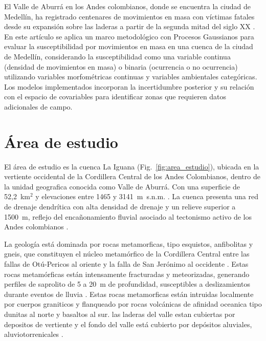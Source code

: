 \documentclass[letterpaper,11pt]{tec}
\begin{document}
{El Valle de Aburrá en los Andes colombianos, donde se encuentra la ciudad de Medellín, ha registrado
centenares de movimientos en masa con víctimas fatales desde su expansión sobre las laderas a partir de la segunda mitad del siglo XX \citep{Nieto2025, Klimes2010}.
En este artículo se aplica un marco metodológico con Procesos Gaussianos para evaluar la susceptibilidad por movimientos en masa en una cuenca de la ciudad de Medellín, 
considerando la susceptibilidad como una variable continua (densidad de movimientos en masa) o binaria (ocurrencia o no ocurrencia)
 utilizando variables morfométricas continuas y variables ambientales categóricas. Los modelos implementados incorporan la incertidumbre posterior y su relación 
 con el espacio de covariables para identificar zonas que requieren datos adicionales de campo.

\section{Área de estudio}

El área de estudio es la cuenca La Iguana (Fig.~\ref{fig:area_estudio}), ubicada en la vertiente occidental de la Cordillera
Central de los Andes Colombianos, dentro de la unidad geografica conocida como Valle de Aburrá. Con una superficie de 52{,}2~km$^2$ 
y elevaciones entre 1465 y 3141~m~s.n.m. \citep{AristizabalYokota2008}. La cuenca presenta una red de drenaje dendrítica con alta densidad de drenaje
 y un relieve superior a 1500~m, reflejo del encañonamiento fluvial asociado al tectonismo activo de los Andes colombianos
\citep{AristizabalYokota2008, GarciaDelgado2020}.

La geología está dominada por rocas metamorficas, tipo esquistos, anfibolitas y gneis, que constituyen el núcleo metamórfico de la 
Cordillera Central entre las fallas de Otú-Pericos
al oriente y la falla de San Jerónimo al occidente \citep{MayaGonzalez1995, Vinasco2006}. Estas rocas metamórficas están
intensamente fracturadas y meteorizadas, generando perfiles de saprolito de 5 a 20~m de profundidad, susceptibles a deslizamientos
 durante eventos de lluvia \citep{Aristizabal2023}. Estas rocas metamorficas están intruidas localmente por cuerpos graniticos y 
 flanqueado por rocas volcánicas de afinidad oceanica tipo dunitas al norte y basaltos al sur. las laderas del valle estan cubiertas por 
 depositos de vertiente \citep{Garcia2006} y el fondo del valle está cubierto por depósitos aluviales, aluviotorrenicales \citep{MayaGonzalez1995}.

}
\end{document}
